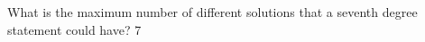{What is the maximum number of different solutions that a seventh degree statement could have?}
{7}
